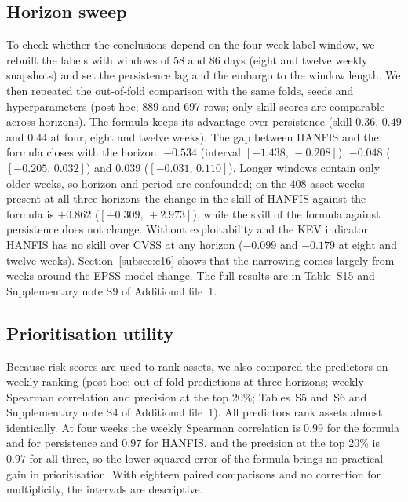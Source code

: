 \documentclass[referee,lineno,pdflatex,sn-basic]{sn-jnl}%
\theoremstyle{thmstyleone}%
\theoremstyle{thmstyletwo}%
\theoremstyle{thmstylethree}%
\begin{document}
\subsection{Horizon sweep}\label{subsec:e14}
To check whether the conclusions depend on the four-week label window, we rebuilt the labels with windows of 58 and 86 days (eight and twelve weekly snapshots) and set the persistence lag and the embargo to the window length. We then repeated the out-of-fold comparison with the same folds, seeds and hyperparameters (post hoc; 889 and 697 rows; only skill scores are comparable across horizons). The formula keeps its advantage over persistence (skill $0.36$, $0.49$ and $0.44$ at four, eight and twelve weeks). The gap between HANFIS and the formula closes with the horizon: $-0.534$ (interval $[-1.438,\,-0.208]$), $-0.048$ ($[-0.205,\,0.032]$) and $0.039$ ($[-0.031,\,0.110]$). Longer windows contain only older weeks, so horizon and period are confounded; on the 408 asset-weeks present at all three horizons the change in the skill of HANFIS against the formula is $+0.862$ ($[+0.309,\,+2.973]$), while the skill of the formula against persistence does not change. Without exploitability and the KEV indicator HANFIS has no skill over CVSS at any horizon ($-0.099$ and $-0.179$ at eight and twelve weeks). Section~\ref{subsec:e16} shows that the narrowing comes largely from weeks around the EPSS model change. The full results are in Table~S15 and Supplementary note S9 of Additional file~1.

\subsection{Prioritisation utility}\label{subsec:e15}
Because risk scores are used to rank assets, we also compared the predictors on weekly ranking (post hoc; out-of-fold predictions at three horizons; weekly Spearman correlation and precision at the top 20\%; Tables~S5 and~S6 and Supplementary note S4 of Additional file~1). All predictors rank assets almost identically. At four weeks the weekly Spearman correlation is $0.99$ for the formula and for persistence and $0.97$ for HANFIS, and the precision at the top 20\% is $0.97$ for all three, so the lower squared error of the formula brings no practical gain in prioritisation. With eighteen paired comparisons and no correction for multiplicity, the intervals are descriptive.
\end{document}
